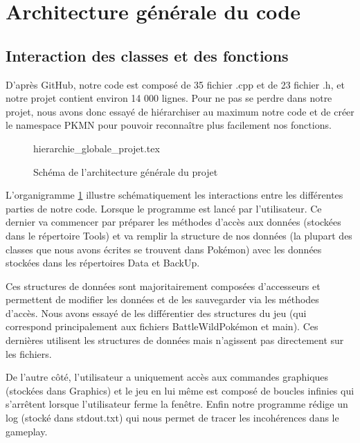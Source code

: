 \section{Architecture générale du code}

\subsection{Interaction des classes et des fonctions}
D'après GitHub, notre code est composé de 35 fichier .cpp et de 23 fichier .h, et notre projet contient environ 14 000 lignes. Pour ne pas se perdre dans notre projet, nous avons donc essayé de hiérarchiser au maximum notre code et de créer le namespace PKMN pour pouvoir reconnaître plus facilement nos fonctions. 

\begin{figure}[!h]\centering
{hierarchie_globale_projet.tex}
\caption{\label{ArchiGenerale}Schéma de l'architecture générale du projet}
\end{figure}

L'organigramme \ref{ArchiGenerale} illustre schématiquement les interactions entre les différentes parties de notre code. Lorsque le programme est lancé par l'utilisateur. Ce dernier va commencer par préparer les méthodes d'accès aux données (stockées dans le répertoire Tools) et va remplir la structure de nos données (la plupart des classes que nous avons écrites se trouvent dans Pokémon) avec les données stockées dans les répertoires Data et BackUp. 

Ces structures de données sont majoritairement composées d'accesseurs et permettent de modifier les données et de les sauvegarder via les méthodes d'accès. Nous avons essayé de les différentier des structures du jeu (qui correspond principalement aux fichiers BattleWildPokémon et main). Ces dernières utilisent les structures de données mais n'agissent pas directement sur les fichiers. 

De l'autre côté, l'utilisateur a uniquement accès aux commandes graphiques (stockées dans Graphics) et le jeu en lui même est composé de boucles infinies qui s'arrêtent lorsque l'utilisateur ferme la fenêtre.
Enfin notre programme rédige un log (stocké dans stdout.txt) qui nous permet de tracer les incohérences dans le gameplay. 

